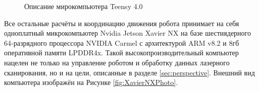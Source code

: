 \documentclass[12pt,a4paper]{scrartcl}
\begin{document}
					\begin{figure}[h]
						\caption{Описание мирокомпьютера Teensy 4.0}
						\label{fig:TeensyDesc}
					\end{figure}
					
					Все остальные расчёты и координацию движения робота принимает на себя одноплатный микрокомпьютер Nvidia Jetson Xavier NX на базе шестиядерного 64-разрядного процессора NVIDIA Carmel с архитектурой ARM v8.2 и 8гб оперативной памяти LPDDR4x\cite{bib:XavierNXDesc}. Такой высокопроизводительный компьютер нацелен не только на управление роботом и обработку данных лазерного сканирования, но и на цели, описанные в разделе \ref{sec:perspective}. Внешний вид компьютера изображён на Рисунке \ref{fig:XavierNXPhoto}.
					
\end{document}
